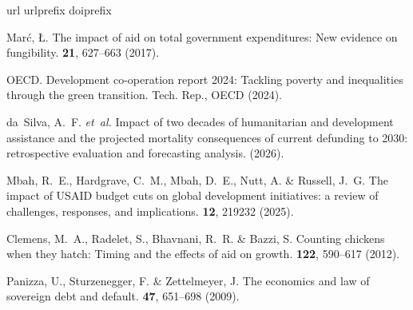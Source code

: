 \documentclass[fleqn,10pt,twocolumn]{wlscirep}
\begin{document}
% 
\begin{thebibliography}{10}
\expandafter\ifx\csname url\endcsname\relax
  \def\url#1{\texttt{#1}}\fi
\expandafter\ifx\csname urlprefix\endcsname\relax\def\urlprefix{URL }\fi
\expandafter\ifx\csname doiprefix\endcsname\relax\def\doiprefix{DOI: }\fi
\providecommand{\bibinfo}[2]{#2}
\providecommand{\eprint}[2][]{\url{#2}}

\bibinfo{author}{Mar{\'c}, {\L}.}
\newblock \bibinfo{journal}{\bibinfo{title}{The impact of aid on total government expenditures: New evidence on fungibility}}.
 \textbf{\bibinfo{volume}{21}}, \bibinfo{pages}{627--663} (\bibinfo{year}{2017}).

\bibinfo{author}{OECD}.
\newblock \bibinfo{title}{Development co-operation report 2024: Tackling poverty and inequalities through the green transition}.
\newblock \bibinfo{type}{Tech. Rep.}, \bibinfo{institution}{OECD} (\bibinfo{year}{2024}).

\bibinfo{author}{da~Silva, A.~F.} \emph{et~al.}
\newblock \bibinfo{journal}{\bibinfo{title}{Impact of two decades of humanitarian and development assistance and the projected mortality consequences of current defunding to 2030: retrospective evaluation and forecasting analysis}}.
  (\bibinfo{year}{2026}).

\bibinfo{author}{Mbah, R.~E.}, \bibinfo{author}{Hardgrave, C.~M.}, \bibinfo{author}{Mbah, D.~E.}, \bibinfo{author}{Nutt, A.} \& \bibinfo{author}{Russell, J.~G.}
\newblock \bibinfo{journal}{\bibinfo{title}{The impact of {USAID} budget cuts on global development initiatives: a review of challenges, responses, and implications}}.
 \textbf{\bibinfo{volume}{12}}, \bibinfo{pages}{219232} (\bibinfo{year}{2025}).

\bibinfo{author}{Clemens, M.~A.}, \bibinfo{author}{Radelet, S.}, \bibinfo{author}{Bhavnani, R.~R.} \& \bibinfo{author}{Bazzi, S.}
\newblock \bibinfo{journal}{\bibinfo{title}{Counting chickens when they hatch: Timing and the effects of aid on growth}}.
 \textbf{\bibinfo{volume}{122}}, \bibinfo{pages}{590--617} (\bibinfo{year}{2012}).

\bibinfo{author}{Panizza, U.}, \bibinfo{author}{Sturzenegger, F.} \& \bibinfo{author}{Zettelmeyer, J.}
\newblock \bibinfo{journal}{\bibinfo{title}{The economics and law of sovereign debt and default}}.
 \textbf{\bibinfo{volume}{47}}, \bibinfo{pages}{651--698} (\bibinfo{year}{2009}).


\end{thebibliography}
\end{document}
